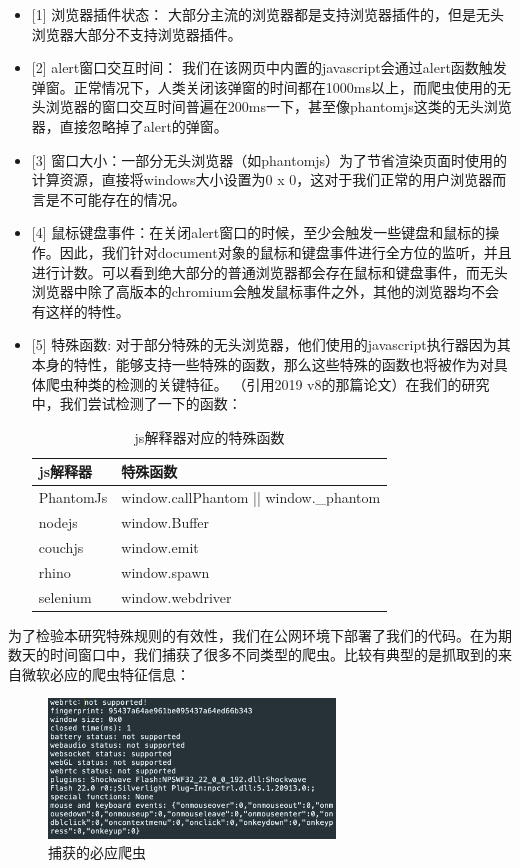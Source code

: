 \documentclass[doctor,privacy,twoside]{buaa_mac}
\begin{document}
\begin{itemize}
\item{[1]} 浏览器插件状态： 大部分主流的浏览器都是支持浏览器插件的，但是无头浏览器大部分不支持浏览器插件。
\item{[2]} alert窗口交互时间： 我们在该网页中内置的javascript会通过alert函数触发弹窗。正常情况下，人类关闭该弹窗的时间都在1000ms以上，而爬虫使用的无头浏览器的窗口交互时间普遍在200ms一下，甚至像phantomjs这类的无头浏览器，直接忽略掉了alert的弹窗。
\item{[3]} 窗口大小：一部分无头浏览器（如phantomjs）为了节省渲染页面时使用的计算资源，直接将windows大小设置为0 x 0，这对于我们正常的用户浏览器而言是不可能存在的情况。
\item{[4]} 鼠标键盘事件：在关闭alert窗口的时候，至少会触发一些键盘和鼠标的操作。因此，我们针对document对象的鼠标和键盘事件进行全方位的监听，并且进行计数。可以看到绝大部分的普通浏览器都会存在鼠标和键盘事件，而无头浏览器中除了高版本的chromium会触发鼠标事件之外，其他的浏览器均不会有这样的特性。
\item{[5]} 特殊函数: 对于部分特殊的无头浏览器，他们使用的javascript执行器因为其本身的特性，能够支持一些特殊的函数，那么这些特殊的函数也将被作为对具体爬虫种类的检测的关键特征。 （引用2019 v8的那篇论文）在我们的研究中，我们尝试检测了一下的函数：

\centerline{}
\begin{table}[h]
  \caption{js解释器对应的特殊函数}
  \label{tab:papercomponents}
  \centering
\begin{tabular}{|p{3cm}<{\centering}||p{6cm}<{\centering}|}
    \hline
   js解释器 &  特殊函数   \\
    \hline
PhantomJs &  window.callPhantom || window.\_{}phantom \\
\hline
nodejs & window.Buffer \\
\hline
couchjs & window.emit  \\
\hline
rhino & window.spawn \\
\hline
selenium & window.webdriver \\
\hline
    \end{tabular}
\end{table}
\centerline{}

\end{itemize}


为了检验本研究特殊规则的有效性，我们在公网环境下部署了我们的代码。在为期数天的时间窗口中，我们捕获了很多不同类型的爬虫。比较有典型的是抓取到的来自微软必应的爬虫特征信息：

\centerline{}
\begin{figure}[!h]
  \centering
  \includegraphics[width=0.68\textwidth]{images/bing_crawler.png}
  \caption{捕获的必应爬虫}
  \label{fig:logo}
\end{figure}
\centerline{}
\end{document}
